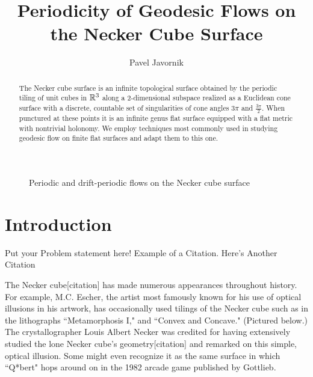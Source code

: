 \documentclass[]{article}
\begin{document}
\newtheorem{thm}{Theorem}[]
\newtheorem{Def}{Definition}[]
\newtheorem*{thm*}{Theorem}
\newtheorem*{def*}{Definition}
\newtheorem{lem}{Lemma}
\newtheorem*{rem}{Remark}
\newcommand{\shiftleft}[2]{\makebox[0pt][r]{\makebox[#1][l]{#2}}}
\newtheorem*{conj}{Conjecture}
\newtheorem{cor}{Corollary}[]

\newcommand{\compav}[1]{\textbf{\textcolor{blue}{#1}}}
\newcommand{\compat}[1]{\textbf{\textcolor{red}{#1}}}
\graphicspath{{images/}}



\title{Periodicity of Geodesic Flows on the Necker Cube Surface}
\author{Pavel Javornik}

\maketitle

%

\begin{abstract}
The Necker cube surface is an infinite topological surface obtained by the periodic tiling of unit cubes in $\mathbb{R}^3$ along a 2-dimensional subspace realized as a Euclidean cone surface with a discrete, countable set of singularities of cone angles $3\pi$ and $\frac{3\pi}{2}$. When punctured at these points it is an infinite genus flat surface equipped with a flat metric with nontrivial holonomy. We employ techniques most commonly used in studying geodesic flow on finite flat surfaces and adapt them to this one.     \\
\end{abstract}
\begin{figure}[H]
\centering

\label{fig:front}
\caption{Periodic and drift-periodic flows on the Necker cube surface}
\end{figure}


\newpage
\section{Introduction}

Put your Problem statement here! Example of a Citation\cite[p.219]{Robotics}. Here's Another Citation \cite{Flueck}

The Necker cube[citation] has made numerous appearances throughout history. For example, M.C. Escher, the artist most famously known for his use of optical illusions in his artwork, has occasionally used tilings of the Necker cube such as in the lithographs ``Metamorphosis I," and ``Convex and Concave." (Pictured below.) The crystallographer Louis Albert Necker was credited for having extensively studied the lone Necker cube's geometry[citation] and remarked on this simple, optical illusion. Some might even recognize it as the same surface in which ``Q*bert" hops around on in the 1982 arcade game published by Gottlieb.
\end{document}
